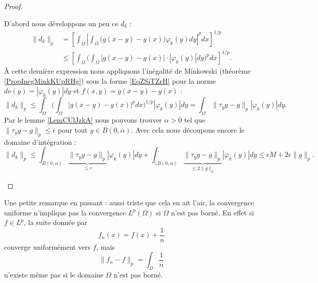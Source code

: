 \begin{proof}
\begin{enumerate}
            D'abord nous développons un peu ce \( d_k\) :
            \begin{subequations}
                \begin{align}
                \| d_k \|_p&=\left[ \int_{\Omega}\left|     \int_{\Omega}\big( g(x-y)-g(x) \big)\varphi_k(y)dy  \right|^pdx \right]^{1/p}\\
                &\leq\left[    \int_{\Omega}\Big( \int_{\Omega}| g(x-y)-g(x) |\cdot |\varphi_k(y) |dy \Big)^pdx \right]^{1/p}.
                \end{align}
            \end{subequations}
            À cette dernière expression nous appliquons l'inégalité de Minkowski (théorème \ref{PropInegMinkKUpRHg}) sous la forme \eqref{EqZSiTZrH} pour la norme \( d\nu(y)=| \varphi_k(y) |dy\) et \( f(x,y)=g(x-y)-g(x)\) :
            \begin{equation}
                \| d_k \|_p\leq \int_{\Omega}\Big( \int_{\Omega}\big| g(x-y)-g(x) \big|^pdx \Big)^{1/p}| \varphi_k(y) |dy=\int_{\Omega}\| \tau_yg-g \|_p| \varphi_k(y) |dy.
            \end{equation}
            Par le lemme \ref{LemCUlJzkA} nous pouvons trouver \( \alpha>0\) tel que \( \| \tau_yg-g \|_p\leq \epsilon\) pour tout \( y\in B(0,\alpha)\). Avec cela nous découpons encore le domaine d'intégration :
            \begin{equation}
                \| d_k \|_p\leq \int_{B(0,\alpha)}\underbrace{\| \tau_yg-g \|_p}_{\leq \epsilon}| \varphi_k(y) |dy+\int_{\complement B(0,\alpha)}  \underbrace{\| \tau_yg-g \|_p}_{\leq 2\| g \|_p}| \varphi_k(y) |dy\leq \epsilon M+2\epsilon\| g \|_p.
            \end{equation}
    \end{enumerate}
\end{proof}

Une petite remarque en passant : aussi triste que cela en ait l'air, la convergence uniforme n'implique pas la convergence \( L^p(\Omega)\) si \( \Omega\) n'est pas borné. En effet si \( f\in L^p\), la suite donnée par
\begin{equation}
    f_n(x)=f(x)+\frac{1}{ n }
\end{equation}
converge uniformément vers \( f\), mais
\begin{equation}
    \| f_n-f \|_p=\int_{\Omega}\frac{1}{ n }
\end{equation}
n'existe même pas si le domaine \( \Omega\) n'est pas borné.

